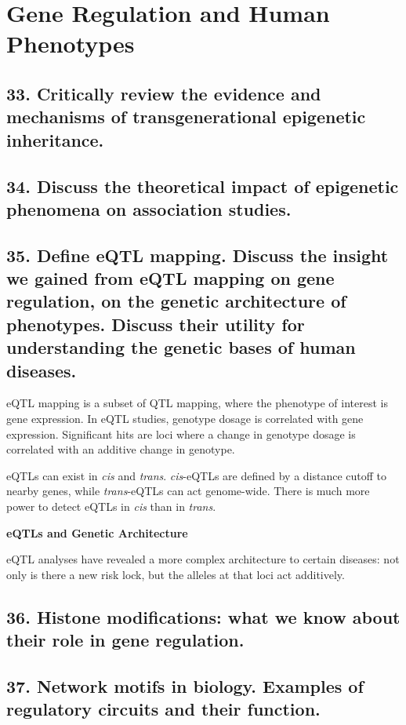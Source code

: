 \documentclass{tufte-handout}
\theoremstyle{noparens}
\begin{document}
\newpage
\section{Gene Regulation and Human Phenotypes}\label{sec:genreg}
\subsection{33. Critically review the evidence and mechanisms of transgenerational epigenetic inheritance.}

\newpage
\subsection{34. Discuss the theoretical impact of epigenetic phenomena on association studies.}

\newpage
\subsection{35. Define eQTL mapping. Discuss the insight we gained from eQTL mapping on gene regulation, on the genetic architecture of phenotypes. Discuss their utility for understanding the genetic bases of human diseases.}

eQTL mapping is a subset of QTL mapping, where the phenotype of interest is gene expression. In eQTL studies, genotype dosage is correlated with gene expression. Significant hits are loci where a change in genotype dosage is correlated with an additive change in genotype.

eQTLs can exist in \emph{cis} and \emph{trans}. \emph{cis}-eQTLs are defined by a distance cutoff to nearby genes, while \emph{trans}-eQTLs can act genome-wide. There is much more power to detect eQTLs in \emph{cis} than in \emph{trans}.

\noindent
\textbf{eQTLs and Genetic Architecture}

eQTL analyses have revealed a more complex architecture to certain diseases: not only is there a new risk lock, but the alleles at that loci act additively.

\newpage
\subsection{36. Histone modifications: what we know about their role in gene regulation.}

\newpage
\subsection{37. Network motifs in biology. Examples of regulatory circuits and their function.}
\end{document}
